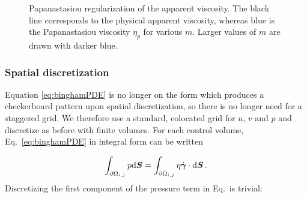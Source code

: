 \documentclass[final,3p,twocolumn]{elsarticle}
\begin{document}
\begin{figure}[htb]
    \centering
    \caption
    {
        Papanastasiou regularization of the apparent viscosity. The black line
        corresponds to the physical apparent viscosity, whereas blue is the
        Papanastasiou viscosity $\eta_p$ for various $m$.  Larger values of $m$
        are drawn with darker blue. 
    }
    \label{fig:regularization}
\end{figure}

\subsubsection{Spatial discretization}

Equation \eqref{eq:binghamPDE} is no longer on the form which produces a
checkerboard pattern upon spatial discretization, so there is no longer need
for a staggered grid. We therefore use a standard, colocated grid for $u$, $v$
and $p$ and discretize as before with finite volumes. For each control volume,
Eq.\ \eqref{eq:binghamPDE} in integral form can be written

\begin{equation}
    \int_{\partial \Omega_{i,j}} p {\rm d}\bm{S} = \int_{\partial \Omega_{i,j}}
    \eta \dot{\bm{\gamma}} \cdot {\rm d}\bm{S} \,.
    \label{eq:binghamFVM}
\end{equation}
%
Discretizing the first component of the pressure term in Eq.\ is trivial: 
\end{document}
